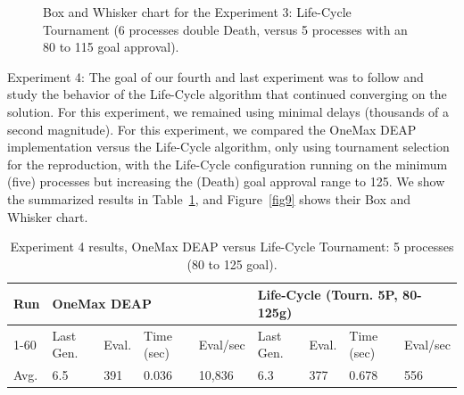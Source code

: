\documentclass[runningheads]{llncs}
\begin{document}
\begin{figure}
    \caption{Box and Whisker chart for the Experiment 3: Life-Cycle Tournament (6 processes double Death, versus 5 processes with an 80 to 115 goal approval).} \label{fig8}
    \end{figure}


Experiment 4: The goal of our fourth and last experiment was to follow and
study the behavior of the Life-Cycle algorithm that continued converging on the
solution. For this experiment, we remained using minimal delays (thousands of a
second magnitude). For this experiment, we compared the OneMax DEAP
implementation versus the Life-Cycle algorithm, only using tournament selection
for the reproduction, with the Life-Cycle configuration running on the minimum
(five) processes but increasing the (Death) goal approval range to 125. We show
the summarized results in Table~\ref{tab5}, and Figure~\ref{fig9} shows their Box and Whisker
chart.

\begin{table}[]
    \centering        
    \caption{Experiment 4 results, OneMax DEAP versus Life-Cycle Tournament: 5 processes (80 to 125 goal).}\label{tab5}
    \begin{tabular}{|l|l|l|l|l|l|l|l|l|}
    \hline
    Run & \multicolumn{4}{l|}{OneMax DEAP} & \multicolumn{4}{l|}{Life-Cycle (Tourn. 5P, 80-125g)} \\ \hline
    1-60 & Last Gen. & Eval. & Time (sec) & Eval/sec & Last Gen. & Eval. & Time (sec) & Eval/sec \\ \hline
    Avg. & 6.5 & 391 & 0.036 & 10,836 & 6.3 & 377 & 0.678 & 556 \\ \hline
    \end{tabular}
    \end{table}
\end{document}
